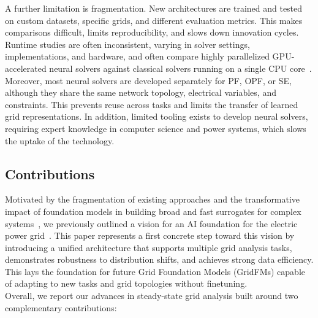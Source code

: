 A further limitation is fragmentation. New architectures are trained and tested on custom datasets, specific grids, and different evaluation metrics. This makes comparisons difficult, limits reproducibility, and slows down innovation cycles. Runtime studies are often inconsistent, varying in solver settings, implementations, and hardware, and often compare highly parallelized GPU-accelerated neural solvers against classical solvers running on a single CPU core~\cite{piloto2024, arowolo2025,varbella2024physicsinformedgnnnonlinearconstrained}. Moreover, most neural solvers are developed separately for PF, OPF, or SE, although they share the same network topology, electrical variables, and constraints. This prevents reuse across tasks and limits the transfer of learned grid representations. In addition, limited tooling exists to develop neural solvers, requiring expert knowledge in computer science and power systems, which slows the uptake of the technology. 



\subsection*{Contributions}

Motivated by the fragmentation of existing approaches and the transformative impact of foundation models in building broad and fast surrogates for complex systems~\cite{bommasani2021opportunities,mukkavilli2023aifoundationmodelsweather,jakubik2023foundation}, we previously outlined a vision for an AI foundation for the electric power grid~\cite{hamann2024foundation}. This paper represents a first concrete step toward this vision by introducing a unified architecture that supports multiple grid analysis tasks, demonstrates robustness to distribution shifts, and achieves strong data efficiency. This lays the foundation for future Grid Foundation Models (GridFMs) capable of adapting to new tasks and grid topologies without finetuning. \\

Overall, we report our advances in steady-state grid analysis built around two complementary contributions:

